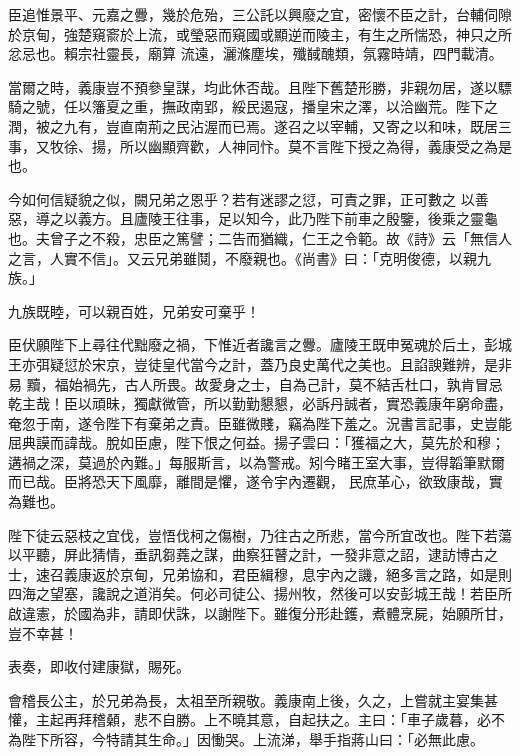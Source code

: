 \begin{pinyinscope}
 臣追惟景平、元嘉之釁，幾於危殆，三公託以興廢之宜，密懷不臣之計，台輔伺隙於京甸，強楚窺窬於上流，或瑩惡而窺國或顯逆而陵主，有生之所惴恐，神只之所忿忌也。賴宗社靈長，廟算
 流遠，灑滌塵埃，殲馘醜類，氛霧時靖，四門載清。



 當爾之時，義康豈不預參皇謀，均此休否哉。且陛下舊楚形勝，非親勿居，遂以驃騎之號，任以籓夏之重，撫政南郢，綏民遏寇，播皇宋之澤，以洽幽荒。陛下之潤，被之九有，豈直南荊之民沾渥而已焉。遂召之以宰輔，又寄之以和味，既居三事，又牧徐、揚，所以幽顯齊歡，人神同忭。莫不言陛下授之為得，義康受之為是也。



 今如何信疑貌之似，闕兄弟之恩乎？若有迷謬之愆，可責之罪，正可數之
 以善惡，導之以義方。且廬陵王往事，足以知今，此乃陛下前車之殷鑒，後乘之靈龜也。夫曾子之不殺，忠臣之篤譬；二告而猶織，仁王之令範。故《詩》云「無信人之言，人實不信」。又云兄弟雖鬩，不廢親也。《尚書》曰：「克明俊德，以親九族。」



 九族既睦，可以親百姓，兄弟安可棄乎！



 臣伏願陛下上尋往代黜廢之禍，下惟近者讒言之釁。廬陵王既申冤魂於后土，彭城王亦弭疑愆於宋京，豈徒皇代當今之計，蓋乃良史萬代之美也。且諂諛難辨，是非易
 黷，福始禍先，古人所畏。故愛身之士，自為己計，莫不結舌杜口，孰肯冒忌乾主哉！臣以頑昧，獨獻微管，所以勤勤懇懇，必訴丹誠者，實恐義康年窮命盡，奄忽于南，遂令陛下有棄弟之責。臣雖微賤，竊為陛下羞之。況書言記事，史豈能屈典謨而諱哉。脫如臣慮，陛下恨之何益。揚子雲曰：「獲福之大，莫先於和穆；遘禍之深，莫過於內難。」每服斯言，以為警戒。矧今睹王室大事，豈得韜筆默爾而已哉。臣將恐天下風靡，離間是懼，遂令宇內遷觀，
 民庶革心，欲致康哉，實為難也。



 陛下徒云惡枝之宜伐，豈悟伐柯之傷樹，乃往古之所悲，當今所宜改也。陛下若蕩以平聽，屏此猜情，垂訊芻蕘之謀，曲察狂瞽之計，一發非意之詔，逮訪博古之士，速召義康返於京甸，兄弟協和，君臣緝穆，息宇內之譏，絕多言之路，如是則四海之望塞，讒說之道消矣。何必司徒公、揚州牧，然後可以安彭城王哉！若臣所啟違憲，於國為非，請即伏誅，以謝陛下。雖復分形赴鑊，煮體烹屍，始願所甘，豈不幸甚！



 表奏，即收付建康獄，賜死。



 會稽長公主，於兄弟為長，太祖至所親敬。義康南上後，久之，上嘗就主宴集甚懽，主起再拜稽顙，悲不自勝。上不曉其意，自起扶之。主曰：「車子歲暮，必不為陛下所容，今特請其生命。」因慟哭。上流涕，舉手指蔣山曰：「必無此慮。




\end{pinyinscope}
